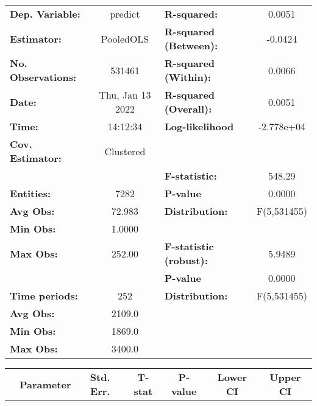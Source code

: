\begin{center}
\begin{tabular}{lclc}
\toprule
\textbf{Dep. Variable:}    &      predict       & \textbf{  R-squared:         }   &      0.0051      \\
\textbf{Estimator:}        &     PooledOLS      & \textbf{  R-squared (Between):}  &     -0.0424      \\
\textbf{No. Observations:} &       531461       & \textbf{  R-squared (Within):}   &      0.0066      \\
\textbf{Date:}             &  Thu, Jan 13 2022  & \textbf{  R-squared (Overall):}  &      0.0051      \\
\textbf{Time:}             &      14:12:34      & \textbf{  Log-likelihood     }   &    -2.778e+04    \\
\textbf{Cov. Estimator:}   &     Clustered      & \textbf{                     }   &                  \\
\textbf{}                  &                    & \textbf{  F-statistic:       }   &      548.29      \\
\textbf{Entities:}         &        7282        & \textbf{  P-value            }   &      0.0000      \\
\textbf{Avg Obs:}          &       72.983       & \textbf{  Distribution:      }   &   F(5,531455)    \\
\textbf{Min Obs:}          &       1.0000       & \textbf{                     }   &                  \\
\textbf{Max Obs:}          &       252.00       & \textbf{  F-statistic (robust):} &      5.9489      \\
\textbf{}                  &                    & \textbf{  P-value            }   &      0.0000      \\
\textbf{Time periods:}     &        252         & \textbf{  Distribution:      }   &   F(5,531455)    \\
\textbf{Avg Obs:}          &       2109.0       & \textbf{                     }   &                  \\
\textbf{Min Obs:}          &       1869.0       & \textbf{                     }   &                  \\
\textbf{Max Obs:}          &       3400.0       & \textbf{                     }   &                  \\
\bottomrule
\end{tabular}
\begin{tabular}{lcccccc}
                & \textbf{Parameter} & \textbf{Std. Err.} & \textbf{T-stat} & \textbf{P-value} & \textbf{Lower CI} & \textbf{Upper CI}  \\

\end{tabular}
\end{center}
